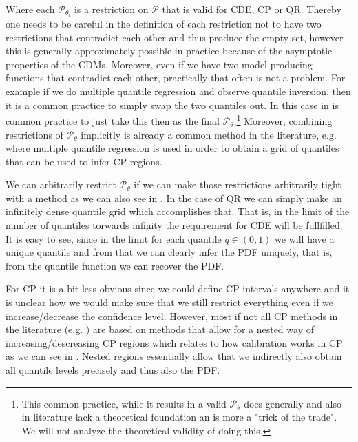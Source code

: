Where each $\mathscr{P}_{\theta_i}$ is a restriction on $\mathcal{P}$ that is valid for CDE, CP or QR. Thereby one needs to be careful in the definition of each restriction not to have two restrictions that contradict each other and thus produce the empty set, however this is generally approximately possible in practice because of the asymptotic properties of the CDMs. Moreover, even if we have two model producing functions that contradict each other, practically that often is not a problem. For example if we do multiple quantile regression and observe quantile inversion, then it is a common practice to simply swap the two quantiles out. In this case in is common practice to just take this then as the final $\mathcal{P}_{\theta}$.\footnote{This common practice, while it results in a valid $\mathcal{P}_{\theta}$ does generally and also in literature lack a theoretical foundation an is more a "trick of the trade". We will not analyze the theoretical validity of doing this.} Moreover, combining restrictions of $\mathcal{P}_\theta$ implicitly is already a common method in the literature, e.g. \cite{sesia2021conformal} where multiple quantile regression is used in order to obtain a grid of quantiles that can be used to infer CP regions.

We can arbitrarily restrict $\mathcal{P}_\theta$ if we can make those restrictions arbitrarily tight with a method as we can also see in . In the case of QR we can simply make an infinitely dense quantile grid which accomplishes that. That is, in the limit of the number of quantiles torwards infinity the requirement for CDE will be fullfilled. It is easy to see, since in the limit for each quantile $q\in(0,1)$ we will have a unique quantile and from that we can clearly infer the PDF uniquely, that is, from the quantile function we can recover the PDF.

For CP it is a bit less obvious since we could define CP intervals anywhere and it is unclear how we would make sure that we still restrict everything even if we increase/decrease the confidence level. However, most if not all CP methods in the literature (e.g. \cite{sesia2021conformal, chernozhukov2021distributional}) are based on methods that allow for a nested way of increasing/descreasing CP regions which relates to how calibration works in CP as we can see in . Nested regions essentially allow that we indirectly also obtain all quantile levels precisely and thus also the PDF.

